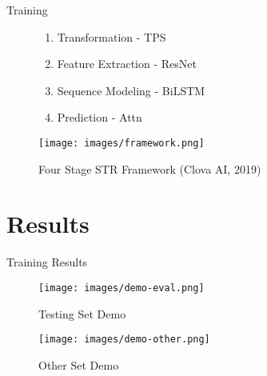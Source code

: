 \documentclass[aspectratio=169]{beamer}
\begin{document}
\begin{frame}{Training} \pause
    \begin{figure}
        \begin{enumerate}
            \item Transformation - TPS \pause
            \item Feature Extraction - ResNet \pause
            \item Sequence Modeling - BiLSTM \pause
            \item Prediction - Attn \pause
        \end{enumerate}
        \texttt{[image: images/framework.png]}
        \caption{Four Stage STR Framework (Clova AI, 2019)}
    \end{figure}
\end{frame}

\section{Results}

\begin{frame}{Training Results} \pause
    \begin{figure}
        \begin{minipage}{0.5\textwidth}
            \centering
            \texttt{[image: images/demo-eval.png]}
            \caption{Testing Set Demo} \pause
        \end{minipage}
        \begin{minipage}{0.5\textwidth}
            \centering
            \texttt{[image: images/demo-other.png]}
            \caption{Other Set Demo}
        \end{minipage}
    \end{figure}
\end{frame}
\end{document}
